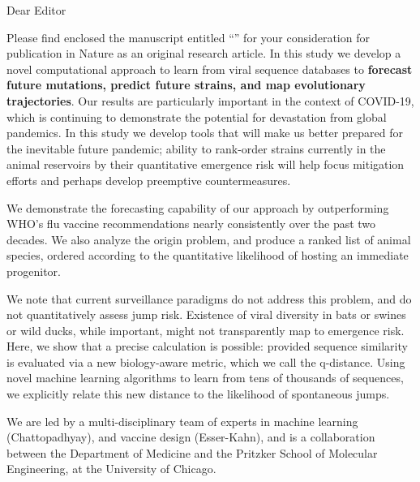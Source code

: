 \documentclass[9pt,onecolumn,compsoc]{IEEEtran}
\newcommand{\Space}{\vspace{10pt}}
\def\EDITOR{Editor}
\def\BEDITOR{Editor\xspace}
\def\JNAME{Proceedings of the National Academy of Sciences \xspace}
\def\JNAME{Nature \xspace}
\def\JADDR{}
\begin{document}
\parskip=12pt
\parindent=0pt
\Space
\Space
\fontsize{11}{12}\selectfont
\Space
\Space


Dear \BEDITOR  

Please find enclosed the  manuscript entitled ``\small \textbf{\TITLE}'' for your consideration for publication in \JNAME as an original research article. In this study we develop a novel computational approach to learn from viral sequence databases to \textbf{forecast future mutations, predict future strains, and map evolutionary trajectories}.
Our results are particularly important in the context of COVID-19, which is continuing to demonstrate the potential for devastation from global pandemics. In this study we develop tools that will make us better prepared for the inevitable future pandemic; ability to rank-order  strains currently in the animal reservoirs by their quantitative emergence risk will help focus mitigation efforts and perhaps develop preemptive countermeasures.

We demonstrate the forecasting capability of our approach by  outperforming WHO's flu vaccine recommendations nearly consistently over the past two decades. We also analyze the  \hcov origin problem, and produce a ranked list of animal species, ordered according to the quantitative likelihood of hosting an immediate progenitor. 

We note that current surveillance paradigms do not address this problem, and do not quantitatively assess jump risk. Existence of  viral diversity in  bats or swines or wild ducks, while important, might not transparently map to  emergence risk. Here, we show that a  precise  calculation is possible: provided  sequence similarity  is evaluated via a new biology-aware metric, which we call the q-distance. Using novel machine learning algorithms to learn from tens of thousands of sequences, we explicitly relate this new distance  to the likelihood of spontaneous jumps. 

We are led by a multi-disciplinary team  of experts in  machine learning (Chattopadhyay), and vaccine design (Esser-Kahn), and is a collaboration between the Department of Medicine and the Pritzker School of Molecular Engineering, at the University of Chicago.
 
\end{document}
